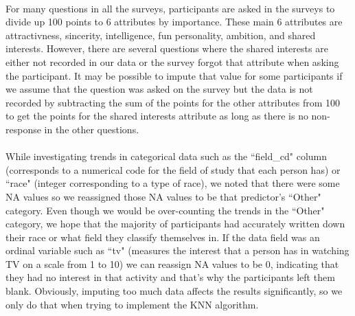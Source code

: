 \documentclass{article}
\begin{document}
\null\\
For many questions in all the surveys, participants are asked in the surveys to divide up 100 points to 6 attributes by importance.  These main 6 attributes are attractivness, sincerity, intelligence, fun personality, ambition, and shared interests.  However, there are several questions where the shared interests are either not recorded in our data or the survey forgot that attribute when asking the participant.  It may be possible to impute that value for some participants if we assume that the question was asked on the survey but the data is not recorded by subtracting the sum of the points for the other attributes from 100 to get the points for the shared interests attribute as long as there is no non-response in the other questions.\\
\null\\
While investigating trends in categorical data such as the ``field\_cd" column (corresponds to a numerical code for the field of study that each person has) or ``race" (integer corresponding to a type of race), we noted that there were some NA values so we reassigned those NA values to be that predictor's ``Other" category.  Even though we would be over-counting the trends in the ``Other" category, we hope that the majority of participants had accurately written down their race or what field they classify themselves in.  If the data field was an ordinal variable such as ``tv" (measures the interest that a person has in watching TV on a scale from 1 to 10) we can reassign NA values to be 0, indicating that they had no interest in that activity and that's why the participants left them blank.  Obviously, imputing too much data affects the results significantly, so we only do that when trying to implement the KNN algorithm.\\
\end{document}
